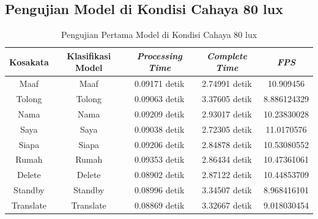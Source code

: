 \newpage
\subsection{Pengujian Model di Kondisi Cahaya 80 lux}
\label{sec:analisiscahaya2}

\begin{longtable}{|c|c|c|c|c|}
  \caption{Pengujian Pertama Model di Kondisi Cahaya 80 lux}
  \label{tb:prediksiremang1}                                   \\
  \hline
  \rowcolor[HTML]{C0C0C0}
  \textbf{Kosakata} & \textbf{Klasifikasi Model} & \textbf{\emph{Processing Time}} & \textbf{\emph{Complete Time}} & \textbf{\emph{FPS}}\\
  \hline
  Maaf              & Maaf                         & 0.09171 detik                           & 2.74991 detik                                  & 10.909456\\
  Tolong            & Tolong                       & 0.09063 detik                           & 3.37605 detik                                  & 8.886124329\\
  Nama              & Nama                         & 0.09209 detik                           & 2.93017 detik                                  & 10.23830028\\
  Saya              & Saya                         & 0.09038 detik                           & 2.72305 detik                                  & 11.0170576\\
  Siapa             & Siapa                        & 0.09206 detik                           & 2.84878 detik                                  & 10.53080552\\
  Rumah             & Rumah                        & 0.09353 detik                           & 2.86434 detik                                  & 10.47361061\\
  Delete            & Delete                       & 0.08902 detik                           & 2.87122 detik                                  & 10.44853709\\
  Standby           & Standby                      & 0.08996 detik                           & 3.34507 detik                                  & 8.968416101\\
  Translate         & Translate                    & 0.08869 detik                           & 3.32667 detik                                  & 9.018030454\\
  \hline
\end{longtable}


